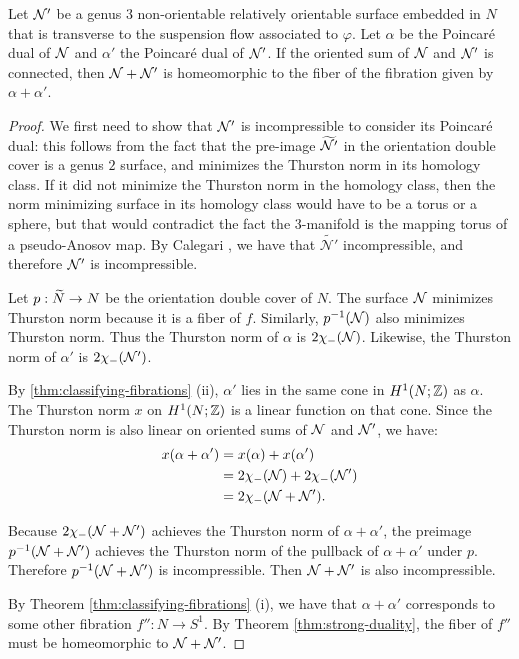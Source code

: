 \begin{prop}
  \label{thm:oriented-sum}
  Let $\mathcal{N}'$ be a genus $3$ non-orientable relatively orientable surface embedded in $N$ that is transverse to the suspension flow associated to $\varphi$.
  Let $\alpha$ be the Poincar\'e dual of $\mathcal{N}$ and $\alpha'$ the Poincar\'e dual of $\mathcal{N}'$.
  If the oriented sum of $\mathcal{N}$ and $\mathcal{N}'$ is connected, then $\mathcal{N} + \mathcal{N}'$ is homeomorphic to the fiber of the fibration given by $\alpha + \alpha'$.
\end{prop}
\begin{proof}
  We first need to show that $\mathcal{N}^{\prime}$ is incompressible to consider its Poincar\'e dual: this follows from the fact that the pre-image $\widetilde{\mathcal{N}^{\prime}}$ in the orientation double cover is a genus $2$ surface, and minimizes the Thurston norm in its homology class.
  If it did not minimize the Thurston norm in the homology class, then the norm minimizing surface in its homology class would have to be a torus or a sphere, but that would contradict the fact the $3$-manifold is the mapping torus of a pseudo-Anosov map. By Calegari \cite[Lemma 5.7]{calegari2007foliations}, we have that $\widetilde{\mathcal{N}'}$ incompressible, and therefore $\mathcal{N}^{\prime}$ is incompressible.

  Let $p:\widetilde{N}\rightarrow N$ be the orientation double cover of $N$.
  The surface $\mathcal{N}$ minimizes Thurston norm because it is a fiber of $f$.  Similarly, $p^{-1}(\mathcal{N})$ also minimizes Thurston norm.  Thus the Thurston norm of $\alpha$ is $2\chi_-(\mathcal{N})$.  Likewise, the Thurston norm of $\alpha'$ is $2\chi_-(\mathcal{N}')$.

By \autoref{thm:classifying-fibrations} (ii), $\alpha'$ lies in the same cone in $H^1(N;\mathbb{Z})$ as $\alpha$.  The Thurston norm $x$ on $H^1(N;\mathbb{Z})$ is a linear function on that cone.
 Since the Thurston norm is also linear on oriented sums of $\mathcal{N}$ and $\mathcal{N}'$, we have:
  \begin{align*}
    x(\alpha + \alpha') &= x(\alpha) + x(\alpha') \\
                        &= 2\chi_-(\mathcal{N}) + 2\chi_-(\mathcal{N}') \\
                        &= 2\chi_-(\mathcal{N} + \mathcal{N}').
  \end{align*}

  Because $2\chi_-(\mathcal{N}+\mathcal{N}')$ achieves the Thurston norm of $\alpha+\alpha'$, the preimage $p^{-1}(\mathcal{N}+\mathcal{N}')$ achieves the Thurston norm of the pullback of $\alpha+\alpha'$ under $p$.  Therefore $p^{-1}(\mathcal{N}+\mathcal{N}')$ is incompressible.  Then $\mathcal{N}+\mathcal{N}'$ is also incompressible.


  By Theorem \ref{thm:classifying-fibrations} (i), we have that $\alpha + \alpha'$ corresponds to some other fibration $f'':N\rightarrow S^1$.
  By Theorem \ref{thm:strong-duality}, the fiber of $f''$ must be homeomorphic to $\mathcal{N} + \mathcal{N}'$.
\end{proof}

